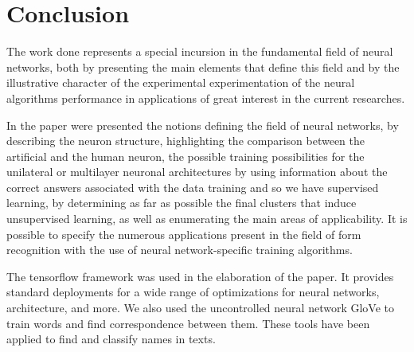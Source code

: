 \section*{Conclusion}

The work done represents a special incursion in the fundamental field of neural networks, both by presenting the main elements that define this field and by the illustrative character of the experimental experimentation of the neural algorithms performance in applications of great interest in the current researches.

In the paper were presented the notions defining the field of neural networks, by describing the neuron structure, highlighting the comparison between the artificial and the human neuron, the possible training possibilities for the unilateral or multilayer neuronal architectures by using information about the correct answers associated with the data training and so we have supervised learning, by determining as far as possible the final clusters that induce unsupervised learning, as well as enumerating the main areas of applicability. It is possible to specify the numerous applications present in the field of form recognition with the use of neural network-specific training algorithms.

The tensorflow framework was used in the elaboration of the paper. It provides standard deployments for a wide range of optimizations for neural networks, architecture, and more. We also used the uncontrolled neural network GloVe to train words and find correspondence between them. These tools have been applied to find and classify names in texts.

